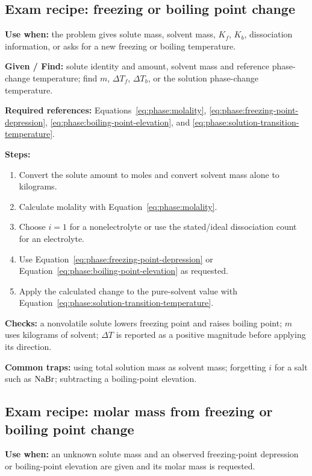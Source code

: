 \subsection{Exam recipe: freezing or boiling point change}
\textbf{Use when:} the problem gives solute mass, solvent mass, \(K_f\), \(K_b\), dissociation information, or asks for a new freezing or boiling temperature.

\textbf{Given / Find:} solute identity and amount, solvent mass and reference phase-change temperature; find \(m\), \(\Delta T_f\), \(\Delta T_b\), or the solution phase-change temperature.

\textbf{Required references:} Equations~\ref{eq:phase:molality}, \ref{eq:phase:freezing-point-depression}, \ref{eq:phase:boiling-point-elevation}, and \ref{eq:phase:solution-transition-temperature}.


\textbf{Steps:}
\begin{enumerate}
    \item Convert the solute amount to moles and convert solvent mass alone to kilograms.
    \item Calculate molality with Equation~\ref{eq:phase:molality}.
    \item Choose \(i=1\) for a nonelectrolyte or use the stated/ideal dissociation count for an electrolyte.
    \item Use Equation~\ref{eq:phase:freezing-point-depression} or Equation~\ref{eq:phase:boiling-point-elevation} as requested.
    \item Apply the calculated change to the pure-solvent value with Equation~\ref{eq:phase:solution-transition-temperature}.
\end{enumerate}

\textbf{Checks:} a nonvolatile solute lowers freezing point and raises boiling point; \(m\) uses kilograms of solvent; \(\Delta T\) is reported as a positive magnitude before applying its direction.

\textbf{Common traps:} using total solution mass as solvent mass; forgetting \(i\) for a salt such as \(\ce{NaBr}\); subtracting a boiling-point elevation.

\subsection{Exam recipe: molar mass from freezing or boiling point change}
\textbf{Use when:} an unknown solute mass and an observed freezing-point depression or boiling-point elevation are given and its molar mass is requested.

